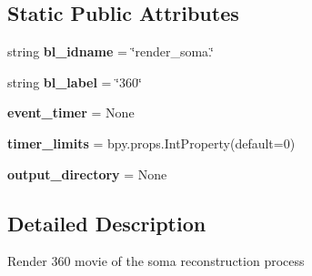 \subsection*{Static Public Attributes}
\begin{DoxyCompactItemize}
\item 
string {\bfseries bl\+\_\+idname} = \char`\"{}render\+\_\+soma.\char`\"{}\hypertarget{classmeshy_1_1neuromorphovis_1_1interface_1_1ui_1_1soma__panel_1_1RenderSoma360_a3dfbcf0510b9328bf6e772a3b1799eae}{}\label{classmeshy_1_1neuromorphovis_1_1interface_1_1ui_1_1soma__panel_1_1RenderSoma360_a3dfbcf0510b9328bf6e772a3b1799eae}

\item 
string {\bfseries bl\+\_\+label} = \char`\"{}360\char`\"{}\hypertarget{classmeshy_1_1neuromorphovis_1_1interface_1_1ui_1_1soma__panel_1_1RenderSoma360_acd609fefda87699ecd1b53f63ce1a9a4}{}\label{classmeshy_1_1neuromorphovis_1_1interface_1_1ui_1_1soma__panel_1_1RenderSoma360_acd609fefda87699ecd1b53f63ce1a9a4}

\item 
{\bfseries event\+\_\+timer} = None\hypertarget{classmeshy_1_1neuromorphovis_1_1interface_1_1ui_1_1soma__panel_1_1RenderSoma360_a0efbee065c113ea92355fad9e9694ed7}{}\label{classmeshy_1_1neuromorphovis_1_1interface_1_1ui_1_1soma__panel_1_1RenderSoma360_a0efbee065c113ea92355fad9e9694ed7}

\item 
{\bfseries timer\+\_\+limits} = bpy.\+props.\+Int\+Property(default=0)\hypertarget{classmeshy_1_1neuromorphovis_1_1interface_1_1ui_1_1soma__panel_1_1RenderSoma360_a6fc34953d9d6d5f1268100bfe850eed6}{}\label{classmeshy_1_1neuromorphovis_1_1interface_1_1ui_1_1soma__panel_1_1RenderSoma360_a6fc34953d9d6d5f1268100bfe850eed6}

\item 
{\bfseries output\+\_\+directory} = None\hypertarget{classmeshy_1_1neuromorphovis_1_1interface_1_1ui_1_1soma__panel_1_1RenderSoma360_afc8136601d35c85f9c37eea9f10aad98}{}\label{classmeshy_1_1neuromorphovis_1_1interface_1_1ui_1_1soma__panel_1_1RenderSoma360_afc8136601d35c85f9c37eea9f10aad98}

\end{DoxyCompactItemize}


\subsection{Detailed Description}
\begin{DoxyVerb}Render 360 movie of the soma reconstruction process\end{DoxyVerb}
 


